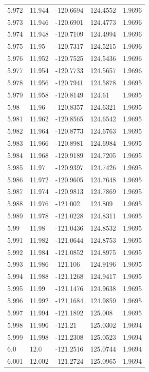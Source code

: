 \begin{tabular}{lllll}
5.972 & 11.944 & -120.6694 & 124.4552 & 1.9696 \\
5.973 & 11.946 & -120.6901 & 124.4773 & 1.9696 \\
5.974 & 11.948 & -120.7109 & 124.4994 & 1.9696 \\
5.975 & 11.95 & -120.7317 & 124.5215 & 1.9696 \\
5.976 & 11.952 & -120.7525 & 124.5436 & 1.9696 \\
5.977 & 11.954 & -120.7733 & 124.5657 & 1.9696 \\
5.978 & 11.956 & -120.7941 & 124.5878 & 1.9695 \\
5.979 & 11.958 & -120.8149 & 124.61 & 1.9695 \\
5.98 & 11.96 & -120.8357 & 124.6321 & 1.9695 \\
5.981 & 11.962 & -120.8565 & 124.6542 & 1.9695 \\
5.982 & 11.964 & -120.8773 & 124.6763 & 1.9695 \\
5.983 & 11.966 & -120.8981 & 124.6984 & 1.9695 \\
5.984 & 11.968 & -120.9189 & 124.7205 & 1.9695 \\
5.985 & 11.97 & -120.9397 & 124.7426 & 1.9695 \\
5.986 & 11.972 & -120.9605 & 124.7648 & 1.9695 \\
5.987 & 11.974 & -120.9813 & 124.7869 & 1.9695 \\
5.988 & 11.976 & -121.002 & 124.809 & 1.9695 \\
5.989 & 11.978 & -121.0228 & 124.8311 & 1.9695 \\
5.99 & 11.98 & -121.0436 & 124.8532 & 1.9695 \\
5.991 & 11.982 & -121.0644 & 124.8753 & 1.9695 \\
5.992 & 11.984 & -121.0852 & 124.8975 & 1.9695 \\
5.993 & 11.986 & -121.106 & 124.9196 & 1.9695 \\
5.994 & 11.988 & -121.1268 & 124.9417 & 1.9695 \\
5.995 & 11.99 & -121.1476 & 124.9638 & 1.9695 \\
5.996 & 11.992 & -121.1684 & 124.9859 & 1.9695 \\
5.997 & 11.994 & -121.1892 & 125.008 & 1.9695 \\
5.998 & 11.996 & -121.21 & 125.0302 & 1.9694 \\
5.999 & 11.998 & -121.2308 & 125.0523 & 1.9694 \\
6.0 & 12.0 & -121.2516 & 125.0744 & 1.9694 \\
6.001 & 12.002 & -121.2724 & 125.0965 & 1.9694 \\

\end{tabular}
